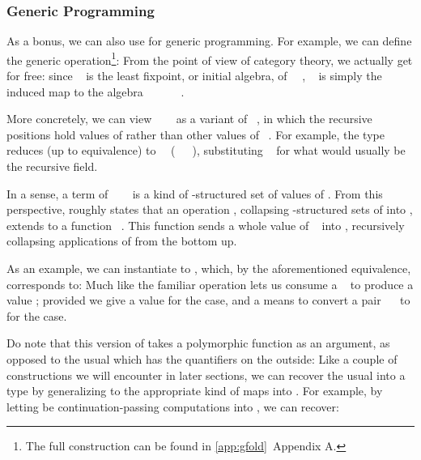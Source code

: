 \subsubsection{Generic Programming}\label{ssec:generic-programming}
As a bonus, we can also use  for generic programming. For example, we can define the generic  operation\footnote{The full construction can be found in \ref{app:gfold}~Appendix A.}:
From the point of view of category theory, we actually get  for free: since \  is the least fixpoint, or initial algebra, of \ \ , \  is simply the induced map to the algebra \ \ \ \ \ \ .

More concretely, we can view \ \ \  as a variant of \ , in which the recursive positions hold values of  rather than other values of \ . For example, the type \ \ \  reduces (up to equivalence) to \ \ (\ \ \ ), substituting \  for what would usually be the recursive field.

In a sense, a term of \ \ \  is a kind of -structured set of values of . From this perspective,  roughly states that an operation , collapsing -structured sets of  into , extends to a function \ . This function sends a whole value of \  into , recursively collapsing applications of  from the bottom up.

As an example, we can instantiate  to , which, by the aforementioned equivalence, corresponds to:
Much like the familiar  operation lets us consume a \  to produce a value ; provided we give a value  for the \AIC{[]} case, and a means to convert a pair \ \  to  for the  case.

Do note that this version of  takes a polymorphic function as an argument, as opposed to the usual  which has the quantifiers on the outside:
Like a couple of constructions we will encounter in later sections, we can recover the usual  into a type  by generalizing  to the appropriate kind of maps into . For example, by letting  be continuation-passing computations into \bN{}, we can recover:


